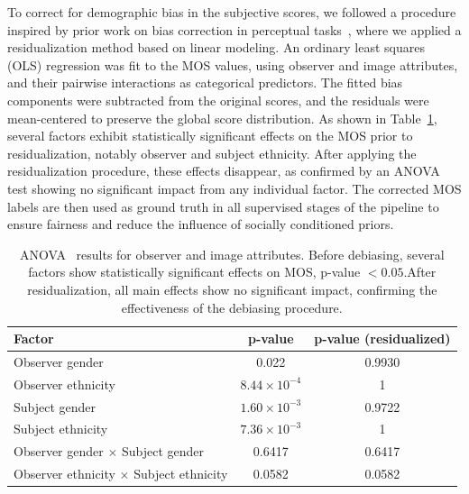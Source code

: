 To correct for demographic bias in the subjective scores, we followed a procedure inspired by prior work on bias correction in perceptual tasks~\cite{clapes2018apparent}, where we applied a residualization method based on linear modeling. An ordinary least squares (OLS) regression was fit to the MOS values, using observer and image attributes, and their pairwise interactions as categorical predictors. The fitted bias components were subtracted from the original scores, and the residuals were mean-centered to preserve the global score distribution. As shown in Table~\ref{tab:anova}, several factors exhibit statistically significant effects on the MOS prior to residualization, notably observer and subject ethnicity. After applying the residualization procedure, these effects disappear, as confirmed by an ANOVA test showing no significant impact from any individual factor. The corrected MOS labels are then used as ground truth in all supervised stages of the pipeline to ensure fairness and reduce the influence of socially conditioned priors.

\begin{table}
    \centering
    \caption{ANOVA~\cite{ross2017one} results for observer and image attributes. Before debiasing, several factors show statistically significant effects on MOS, p-value $< 0.05$.\@ After residualization, all main effects show no significant impact, confirming the effectiveness of the debiasing procedure.}\label{tab:anova}
    \begin{tabular}{lcc}
        \hline %
        Factor & p-value & p-value (residualized) \\
        \hline %
        Observer gender                             & 0.022                 & 0.9930 \\
        Observer ethnicity                          & $8.44 \times 10^{-4}$ & 1 \\
        Subject gender                              & $1.60 \times 10^{-3}$ & 0.9722 \\
        Subject ethnicity                           & $7.36 \times 10^{-3}$ & 1 \\
        Observer gender $\times$ Subject gender     & 0.6417              & 0.6417 \\
        Observer ethnicity $\times$ Subject ethnicity & 0.0582              & 0.0582 \\
        \hline %
    \end{tabular}
\end{table}

